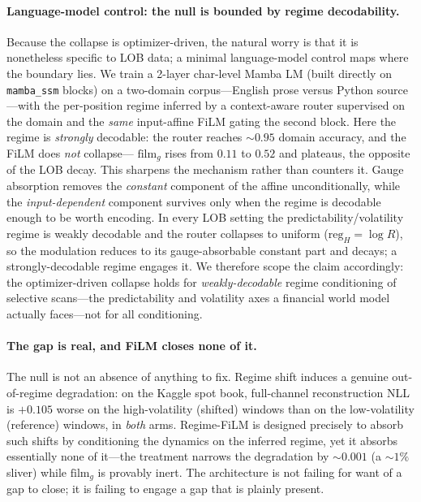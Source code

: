 \documentclass{article}
\begin{document}
\paragraph{Language-model control: the null is bounded by regime decodability.}
Because the collapse is optimizer-driven, the natural worry is that it is
nonetheless specific to LOB data; a minimal language-model control maps where the
boundary lies.  We train a 2-layer char-level Mamba LM (built directly on
\texttt{mamba\_ssm} blocks) on a two-domain corpus---English prose versus Python
source---with the per-position regime inferred by a context-aware router
supervised on the domain and the \emph{same} input-affine FiLM gating the second
block.  Here the regime is \emph{strongly} decodable: the router reaches
${\sim}0.95$ domain accuracy, and the FiLM does \emph{not} collapse---
$\mathrm{film}_g$ rises from $0.11$ to $0.52$ and plateaus, the opposite of the
LOB decay.  This sharpens the mechanism rather than counters it.  Gauge
absorption removes the \emph{constant} component of the affine unconditionally,
while the \emph{input-dependent} component survives only when the regime is
decodable enough to be worth encoding.  In every LOB setting the
predictability/volatility regime is weakly decodable and the router collapses to
uniform ($\mathrm{reg}_H=\log R$), so the modulation reduces to its
gauge-absorbable constant part and decays; a strongly-decodable regime engages
it.  We therefore scope the claim accordingly: the optimizer-driven collapse
holds for \emph{weakly-decodable} regime conditioning of selective scans---the
predictability and volatility axes a financial world model actually faces---not
for all conditioning.

\paragraph{The gap is real, and FiLM closes none of it.}
The null is not an absence of anything to fix. Regime shift induces a genuine out-of-regime
degradation: on the Kaggle spot book, full-channel reconstruction NLL is $+0.105$ worse on
the high-volatility (shifted) windows than on the low-volatility (reference) windows, in
\emph{both} arms. Regime-FiLM is designed precisely to absorb such shifts by conditioning
the dynamics on the inferred regime, yet it absorbs essentially none of it---the treatment
narrows the degradation by $\sim\!0.001$ (a $\sim\!1\%$ sliver) while $\mathrm{film}_g$ is
provably inert. The architecture is not failing for want of a gap to close; it is failing to
engage a gap that is plainly present.
\end{document}
